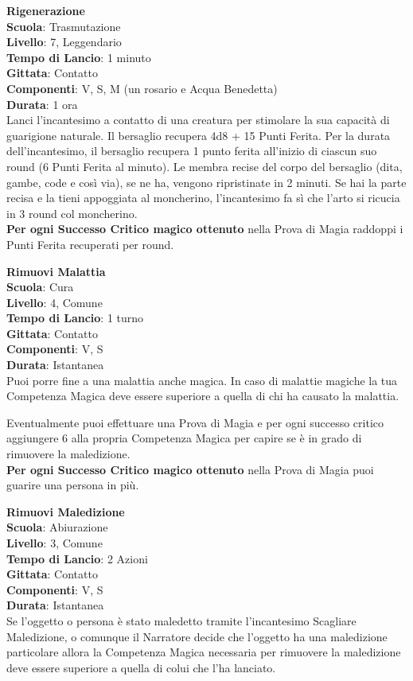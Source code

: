 \begin{multicols}{2}
\medskip\textbf{Rigenerazione}\\
\textbf{Scuola}: Trasmutazione\\
\textbf{Livello}: 7, Leggendario\\
\textbf{Tempo di Lancio}: 1 minuto\\
\textbf{Gittata}: Contatto\\
\textbf{Componenti}: V, S, M (un rosario e Acqua Benedetta)\\
\textbf{Durata}: 1 ora\\
Lanci l'incantesimo a contatto di una creatura per stimolare la sua capacità di guarigione naturale. Il bersaglio recupera 4d8 + 15 Punti Ferita. Per la durata dell'incantesimo, il bersaglio recupera 1 punto ferita all'inizio di ciascun suo round (6 Punti Ferita al minuto). Le membra recise del corpo del bersaglio (dita, gambe, code e così via), se ne ha, vengono ripristinate in 2 minuti. Se hai la parte recisa e la tieni appoggiata al moncherino, l'incantesimo fa sì che l'arto si ricucia in 3 round col moncherino.\\
\textbf{Per ogni Successo Critico magico ottenuto} nella Prova di Magia raddoppi i Punti Ferita recuperati per round.

\medskip\textbf{Rimuovi Malattia}\\
\textbf{Scuola}: Cura\\
\textbf{Livello}: 4, Comune\\
\textbf{Tempo di Lancio}: 1 turno\\
\textbf{Gittata}: Contatto\\
\textbf{Componenti}: V, S\\
\textbf{Durata}: Istantanea\\
Puoi porre fine a una malattia anche magica. In caso di malattie magiche la tua Competenza Magica deve essere superiore a quella di chi ha causato la malattia.

Eventualmente puoi effettuare una Prova di Magia e per ogni successo critico aggiungere 6 alla propria Competenza Magica per capire se è in grado di rimuovere la maledizione.\\
\textbf{Per ogni Successo Critico magico ottenuto} nella Prova di Magia puoi guarire una persona in più.

\medskip\textbf{Rimuovi Maledizione}\\
\textbf{Scuola}: Abiurazione\\
\textbf{Livello}: 3, Comune\\
\textbf{Tempo di Lancio}: 2 Azioni\\
\textbf{Gittata}: Contatto\\
\textbf{Componenti}: V, S\\
\textbf{Durata}: Istantanea\\
Se l'oggetto o persona è stato maledetto tramite l'incantesimo Scagliare Maledizione, o comunque il Narratore decide che l'oggetto ha una maledizione particolare allora la Competenza Magica necessaria per rimuovere la maledizione deve essere superiore a quella di colui che l'ha lanciato.


\end{multicols}
